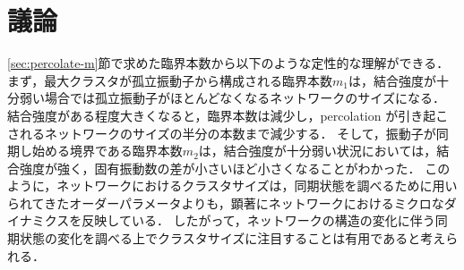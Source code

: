 \documentclass[../main]{subfiles}
\begin{document}
\section{議論}
\ref{sec:percolate-m}節で求めた臨界本数から以下のような定性的な理解ができる．
まず，最大クラスタが孤立振動子から構成される臨界本数$m_1$は，結合強度が十分弱い場合では孤立振動子がほとんどなくなるネットワークのサイズになる．
結合強度がある程度大きくなると，臨界本数は減少し，percolation が引き起こされるネットワークのサイズの半分の本数まで減少する．
そして，振動子が同期し始める境界である臨界本数$m_2$は，結合強度が十分弱い状況においては，結合強度が強く，固有振動数の差が小さいほど小さくなることがわかった．
このように，ネットワークにおけるクラスタサイズは，同期状態を調べるために用いられてきたオーダーパラメータよりも，顕著にネットワークにおけるミクロなダイナミクスを反映している．
したがって，ネットワークの構造の変化に伴う同期状態の変化を調べる上でクラスタサイズに注目することは有用であると考えられる．
\end{document}
